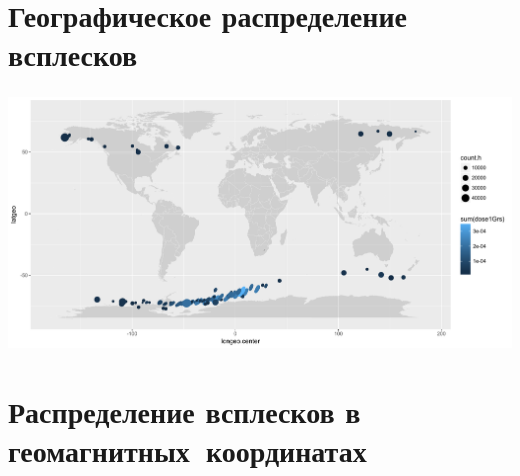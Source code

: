 \documentclass[t, aspectratio=43]{beamer}
\begin{document}
\section{Географическое распределение всплесков}

\begin{frame}	
\frametitle{\insertsection} 
\begin{center}
	\includegraphics[width=1.1\linewidth]{images/flashmap}
\end{center}


\end{frame}

\section{Распределение всплесков в геомагнитных~координатах}
\end{document}
